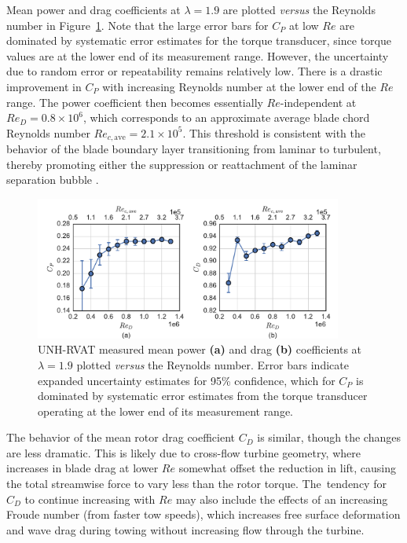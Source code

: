 \documentclass[energies,article,accept,moreauthors,pdftex,10pt,a4paper]{mdpi}
\theoremstyle{mdpi}
\newcounter{ex}
\newcounter{re}
\begin{document}
Mean power and drag coefficients at $\lambda=1.9$ are plotted \textit{versus}
the Reynolds number in Figure~\ref{fig:perf-Re-dep}. Note that the large error
bars for $C_P$ at low $Re$ are dominated by systematic error estimates for the
torque transducer, since torque values are at the lower end of its measurement
range. However, the uncertainty due to random error or repeatability remains
relatively low. There is a drastic improvement in $C_P$ with increasing Reynolds
number at the lower end of the $Re$ range. The power coefficient then becomes
essentially $Re$-independent at $Re_D = 0.8 \times 10^6$, which corresponds to
an approximate average blade chord Reynolds number $Re_{c, \mathrm{ave}} = 2.1
\times 10^5$. This threshold is consistent with the behavior of the blade
boundary layer transitioning from laminar to turbulent, thereby promoting either
the suppression or reattachment of the laminar separation bubble
\cite{Lissaman1983}.



\begin{figure}[H]
\centering

\includegraphics[width=0.9\textwidth]{figures/perf_re_dep}

\caption{UNH-RVAT measured mean power \textbf{(a)} and drag \textbf{(b)}
    coefficients at $\lambda=1.9$ plotted \textit{versus} the Reynolds number. Error
    bars indicate expanded uncertainty estimates for 95\% confidence, which for
    $C_P$ is dominated by systematic error estimates from the torque transducer
    operating at the lower end of its measurement range.}

\label{fig:perf-Re-dep}
\end{figure}

The behavior of the mean rotor drag coefficient $C_D$ is similar, though the
changes are less dramatic. This is likely due to cross-flow turbine geometry,
where increases in blade drag at lower $Re$ somewhat offset the reduction in
lift, causing the total streamwise force to vary less than the rotor torque.
The~tendency for $C_D$ to continue increasing with $Re$ may also include the
effects of an increasing Froude number (from faster tow speeds), which increases
free surface deformation and wave drag during towing without increasing flow
through the turbine.
\end{document}
